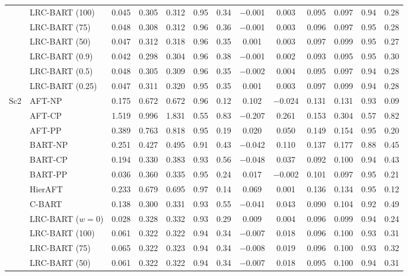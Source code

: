 \begin{center}
\begin{longtable}{llccccccccccc}
& LRC-BART (100) & 0.045 & 0.305 & 0.312 & 0.95 & 0.34 & $-$0.001 & 0.003 & 0.095 & 0.097 & 0.94 & 0.28 \\
& LRC-BART (75) & 0.048 & 0.308 & 0.312 & 0.96 & 0.36 & $-$0.001 & 0.003 & 0.096 & 0.097 & 0.95 & 0.28 \\
& LRC-BART (50) & 0.047 & 0.312 & 0.318 & 0.96 & 0.35 & 0.001 & 0.003 & 0.097 & 0.099 & 0.95 & 0.27 \\
& LRC-BART (0.9) & 0.042 & 0.298 & 0.304 & 0.96 & 0.38 & $-$0.001 & 0.002 & 0.093 & 0.095 & 0.95 & 0.30 \\
& LRC-BART (0.5) & 0.048 & 0.305 & 0.309 & 0.96 & 0.35 & $-$0.002 & 0.004 & 0.095 & 0.097 & 0.94 & 0.28 \\
& LRC-BART (0.25) & 0.047 & 0.311 & 0.320 & 0.95 & 0.35 & 0.001 & 0.003 & 0.097 & 0.099 & 0.94 & 0.28 \\
\midrule
\multirow{15}{*}{Sc2} & AFT-NP & 0.175 & 0.672 & 0.672 & 0.96 & 0.12 & 0.102 & $-$0.024 & 0.131 & 0.131 & 0.93 & 0.09 \\
& AFT-CP & 1.519 & 0.996 & 1.831 & 0.55 & 0.83 & $-$0.207 & 0.261 & 0.153 & 0.304 & 0.57 & 0.82 \\
& AFT-PP & 0.389 & 0.763 & 0.818 & 0.95 & 0.19 & 0.020 & 0.050 & 0.149 & 0.154 & 0.95 & 0.20 \\
& BART-NP & 0.251 & 0.427 & 0.495 & 0.91 & 0.43 & $-$0.042 & 0.110 & 0.137 & 0.177 & 0.88 & 0.45 \\
& BART-CP & 0.194 & 0.330 & 0.383 & 0.93 & 0.56 & $-$0.048 & 0.037 & 0.092 & 0.100 & 0.94 & 0.43 \\
& BART-PP & 0.036 & 0.360 & 0.335 & 0.95 & 0.24 & 0.017 & $-$0.002 & 0.101 & 0.097 & 0.95 & 0.21 \\
& HierAFT & 0.233 & 0.679 & 0.695 & 0.97 & 0.14 & 0.069 & 0.001 & 0.136 & 0.134 & 0.95 & 0.12 \\
& C-BART & 0.138 & 0.300 & 0.331 & 0.93 & 0.55 & $-$0.041 & 0.043 & 0.090 & 0.104 & 0.92 & 0.49 \\
& LRC-BART ($w=0$) & 0.028 & 0.328 & 0.332 & 0.93 & 0.29 & 0.009 & 0.004 & 0.096 & 0.099 & 0.94 & 0.24 \\
& LRC-BART (100) & 0.061 & 0.322 & 0.322 & 0.94 & 0.34 & $-$0.007 & 0.018 & 0.096 & 0.100 & 0.93 & 0.31 \\
& LRC-BART (75) & 0.065 & 0.322 & 0.323 & 0.94 & 0.34 & $-$0.008 & 0.019 & 0.096 & 0.100 & 0.93 & 0.32 \\
& LRC-BART (50) & 0.061 & 0.322 & 0.322 & 0.94 & 0.34 & $-$0.007 & 0.018 & 0.095 & 0.100 & 0.94 & 0.31 \\

\end{longtable}
\end{center}
